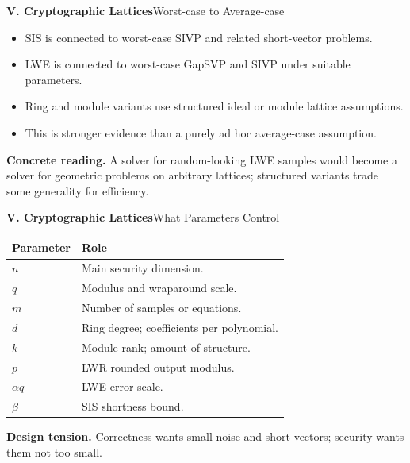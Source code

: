 \begin{frame}[shrink=6]{\textbf{V. Cryptographic Lattices}}{Worst-case to Average-case}
\begin{itemize}
  \item SIS is connected to worst-case SIVP and related short-vector problems.
  \item LWE is connected to worst-case GapSVP and SIVP under suitable parameters.
  \item Ring and module variants use structured ideal or module lattice assumptions.
  \item This is stronger evidence than a purely ad hoc average-case assumption.
\end{itemize}
\textbf{Concrete reading.}\; A solver for random-looking LWE samples would become a solver for geometric problems on arbitrary lattices; structured variants trade some generality for efficiency.
\vspace{-.1cm}
\begin{center}
\end{center}
\end{frame}

\begin{frame}{\textbf{V. Cryptographic Lattices}}{What Parameters Control}
\scriptsize
\begin{center}
\renewcommand{\arraystretch}{1.12}
\begin{tabular}{>{\bfseries}p{}p{}}
\toprule
Parameter & Role \\
\midrule
$n$ & Main security dimension. \\
$q$ & Modulus and wraparound scale. \\
$m$ & Number of samples or equations. \\
$d$ & Ring degree; coefficients per polynomial. \\
$k$ & Module rank; amount of structure. \\
$p$ & LWR rounded output modulus. \\
$\alpha q$ & LWE error scale. \\
$\beta$ & SIS shortness bound. \\
\bottomrule
\end{tabular}
\end{center}
\vspace{-.1cm}
\textbf{\color{red}Design tension.}\; Correctness wants small noise and short vectors; security wants them not too small.
\end{frame}


